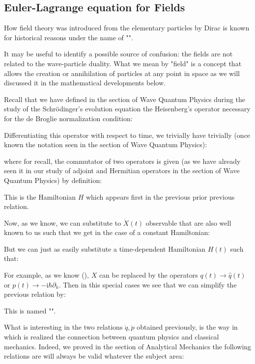 	\pagebreak
	\subsection{Euler-Lagrange equation for Fields}
	How field theory was introduced from the elementary particles by Dirac is known for historical reasons under the name of "".

	It may be useful to identify a possible source of confusion: the fields are not related to the wave-particle duality. What we mean by "field" is a concept that allows the creation or annihilation of particles at any point in space as we will discussed it in the mathematical developments below.

	Recall that we have defined in the section of Wave Quantum Physics during the study of the Schrödinger's evolution equation the Heisenberg's operator necessary for the de Broglie normalization condition:
	
	Differentiating this operator with respect to time, we trivially have trivially (once known the notation seen in the section of Wave Quantum Physics):
	
	where for recall, the commutator of two operators is given (as we have already seen it in our study of adjoint and  Hermitian operators in the section of Wave Quantum Physics) by definition:
	
	This is the Hamiltonian $H$ which appears first in the previous prior previous relation.
	
	Now, as we know, we can substitute to $\dot{X}(t)$ observable that are also well known to us such that we get in the case of a constant Hamiltonian:
	
	But we can just as easily substitute a time-dependent Hamiltonian $H(t)$ such that:
	
	For example, as we know (), $X$ can be replaced by the operators $q(t)\rightarrow \hat{q}(t)$ or $p(t)\rightarrow -\mathrm{i}\hbar\partial_k$. Then in this special cases we see that we can simplify the previous relation by:
	
	This is named "". 
	
	What is interesting in the two relations $\dot{q},\dot{p}$ obtained previously, is the way in which is realized the connection between quantum physics and classical mechanics. Indeed, we proved in the section of Analytical Mechanics the following relations are will always be valid whatever the subject area:
	
